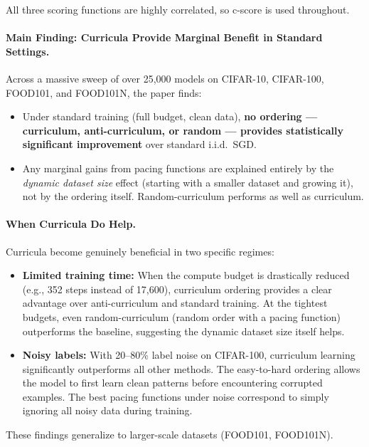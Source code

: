 \documentclass[12pt]{article}
\begin{document}
All three scoring functions are highly correlated, so c-score is used
throughout.

\paragraph{Main Finding: Curricula Provide Marginal Benefit in Standard Settings.}
Across a massive sweep of over 25{,}000 models on CIFAR-10, CIFAR-100,
FOOD101, and FOOD101N, the paper finds:

\begin{itemize}
		\item Under standard training (full budget, clean data), \textbf{no ordering
						--- curriculum, anti-curriculum, or random --- provides statistically
				significant improvement} over standard i.i.d.\ SGD.
		\item Any marginal gains from pacing functions are explained entirely by the
				\emph{dynamic dataset size} effect (starting with a smaller dataset
				and growing it), not by the ordering itself. Random-curriculum performs
				as well as curriculum.
\end{itemize}

\paragraph{When Curricula Do Help.}
Curricula become genuinely beneficial in two specific regimes:

\begin{itemize}
		\item \textbf{Limited training time:} When the compute budget is
				drastically reduced (e.g., 352 steps instead of 17{,}600),
				curriculum ordering provides a clear advantage over anti-curriculum
				and standard training. At the tightest budgets, even random-curriculum
				(random order with a pacing function) outperforms the baseline,
				suggesting the dynamic dataset size itself helps.
		\item \textbf{Noisy labels:} With 20--80\% label noise on CIFAR-100,
				curriculum learning significantly outperforms all other methods.
				The easy-to-hard ordering allows the model to first learn clean
				patterns before encountering corrupted examples. The best pacing
				functions under noise correspond to simply ignoring all noisy data
				during training.
\end{itemize}

These findings generalize to larger-scale datasets (FOOD101, FOOD101N).
\end{document}
